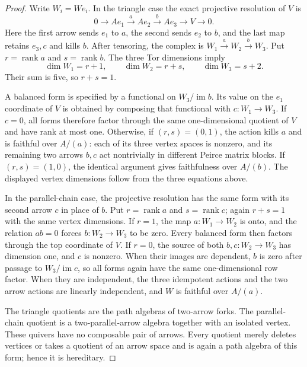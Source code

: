 \begin{proof}
Write $W_i=We_i$.  In the triangle case the exact projective
resolution of $V$ is
\[
 0\longrightarrow Ae_1\xrightarrow{a}Ae_2
 \xrightarrow{b}Ae_3\longrightarrow V\longrightarrow0.
\]
Here the first arrow sends $e_1$ to $a$, the second sends $e_2$
to $b$, and the last map retains $e_3,c$ and kills $b$.
After tensoring, the complex is
$W_1\xrightarrow{a}W_2\xrightarrow{b}W_3$.
Put $r=\operatorname{rank}a$ and $s=\operatorname{rank}b$.
The three Tor dimensions imply
\[
 \dim W_1=r+1,\qquad \dim W_2=r+s,\qquad
 \dim W_3=s+2.
\]
Their sum is five, so $r+s=1$.

A balanced form is specified by a functional on
$W_3/\operatorname{im}b$.  Its value on the $e_1$ coordinate of
$V$ is obtained by composing that functional with
$c:W_1\to W_3$.  If $c=0$, all forms therefore factor through
the same one-dimensional quotient of $V$ and have rank at most
one.  Otherwise, if $(r,s)=(0,1)$, the action kills $a$ and is
faithful over $A/(a)$: each of its three vertex spaces is nonzero,
and its remaining two arrows $b,c$ act nontrivially in different
Peirce matrix blocks.  If $(r,s)=(1,0)$, the identical argument
gives faithfulness over $A/(b)$.  The displayed vertex dimensions
follow from the three equations above.

In the parallel-chain case, the projective resolution has the
same form with its second arrow $c$ in place of $b$.
Put $r=\operatorname{rank}a$ and $s=\operatorname{rank}c$;
again $r+s=1$ with the same vertex dimensions.  If $r=1$, the
map $a:W_1\to W_2$ is onto, and the relation $ab=0$ forces
$b:W_2\to W_3$ to be zero.  Every balanced form then factors
through the top coordinate of $V$.  If $r=0$, the source of
both $b,c:W_2\to W_3$ has dimension one, and $c$ is nonzero.
When their images are dependent, $b$ is zero after passage to
$W_3/\operatorname{im}c$, so all forms again have the same
one-dimensional row factor.  When they are independent, the
three idempotent actions and the two arrow actions are linearly
independent, and $W$ is faithful over $A/(a)$.

The triangle quotients are the path algebras of two-arrow forks.
The parallel-chain quotient is a two-parallel-arrow algebra
together with an isolated vertex.  These quivers have no
composable pair of arrows.  Every quotient merely deletes
vertices or takes a quotient of an arrow space and is again
a path algebra of this form; hence it is hereditary.
\end{proof}

